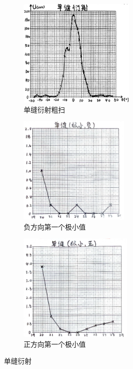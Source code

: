 \documentclass[UTF8]{article}
\theoremstyle{MyLineTheoremStyle} %
\theoremstyle{MyBlockTheoremStyle} %
\theoremstyle{MySubsubsectionStyle} %
\begin{document}
\begin{figure}[H]\centering
\begin{subfigure}[b]{0.33\columnwidth}\centering
    \includegraphics[height=150pt]{assets/1 单缝/1 单缝.png}
    \caption{单缝衍射粗扫}
\end{subfigure}
\begin{subfigure}[b]{0.33\columnwidth}\centering
    \includegraphics[height=150pt]{assets/1 单缝/1 单缝 极小 -.jpg}
    \caption{负方向第一个极小值}
\end{subfigure}\hfill
\begin{subfigure}[b]{0.33\columnwidth}\centering
    \includegraphics[height=150pt]{assets/1 单缝/1 单缝 极小 +.jpg}
    \caption{正方向第一个极小值}
\end{subfigure}
\caption{单缝衍射}
\label{单缝衍射}
\end{figure}
\end{document}
